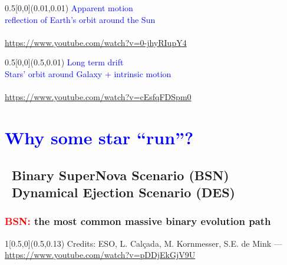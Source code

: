 \documentclass[xcolor=dvipsnames,professionalfonts, aspectratio=169]{beamer}
\begin{document}
\begin{frame}[c,plain]
  \begin{textblock}{0.5}[0,0](0.01,0.01)
    \centering
    \textcolor{Blue}{{\large Apparent motion}\\
      {\small reflection of Earth's orbit around the Sun}}\\[70pt]
    \vfill
      \\
      \textcolor{gray!50}{\tiny \url{https://www.youtube.com/watch?v=0-jhyRIupY4}}
    \end{textblock}
    \begin{textblock}{0.5}[0,0](0.5,0.01)
      \centering
      \textcolor{Blue}{{\large Long term drift}\\
        {\small Stars' orbit around Galaxy + intrinsic motion}}\\[68pt]
      \vfill
      \\
      \textcolor{gray!50}{\tiny \url{https://www.youtube.com/watch?v=cEsfqFDSpm0}}
  \end{textblock}
\end{frame}



\section{\textcolor{Blue}{Why some star ``run''?}}
\subsection{\textcolor{Blue}{\textbullet}~Binary SuperNova Scenario
  (BSN) \\\textcolor{Blue}{\textbullet}~Dynamical Ejection Scenario (DES)}



\begin{frame}
  \frametitle{\textcolor{red}{BSN:} the most common massive binary evolution path}
  \centering
  \vspace*{8pt}


  \begin{textblock}{1}[0.5,0](0.5,0.13)
    \textcolor{gray!50}{\tiny Credits: ESO, L. Calçada, M. Kornmesser,
      S.E. de Mink  --- \url{https://www.youtube.com/watch?v=pDDjEkGjV9U}}
  \end{textblock}
\end{frame}
\end{document}
